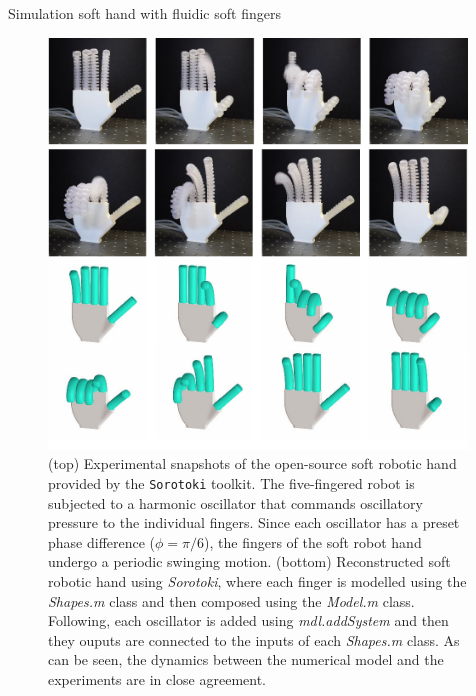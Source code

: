 \begin{example}{Simulation soft hand with fluidic soft fingers}
\begin{figure}[!t]
\centering
\includegraphics*[width=0.99\textwidth]{./pdf/thesis-figurex-6-14-1.pdf}
\caption{\small (top) Experimental snapshots of the open-source soft robotic hand provided by the \texttt{Sorotoki} toolkit. The five-fingered robot is subjected to a harmonic oscillator that commands oscillatory pressure to the individual fingers. Since each oscillator has a preset phase difference ($\phi = \pi/6$), the fingers of the soft robot hand undergo a periodic swinging motion. (bottom) Reconstructed soft robotic hand using \textit{Sorotoki}, where each finger is modelled using the \textit{Shapes.m} class and then composed using the \textit{Model.m} class. Following, each oscillator is added using \textit{mdl.addSystem} and then they ouputs are connected to the inputs of each \textit{Shapes.m} class. As can be seen, the dynamics between the numerical model and the experiments are in close agreement. }
\label{fig:C5:soft_hand_simulation}
\end{figure}
\end{example}
\clearpage
